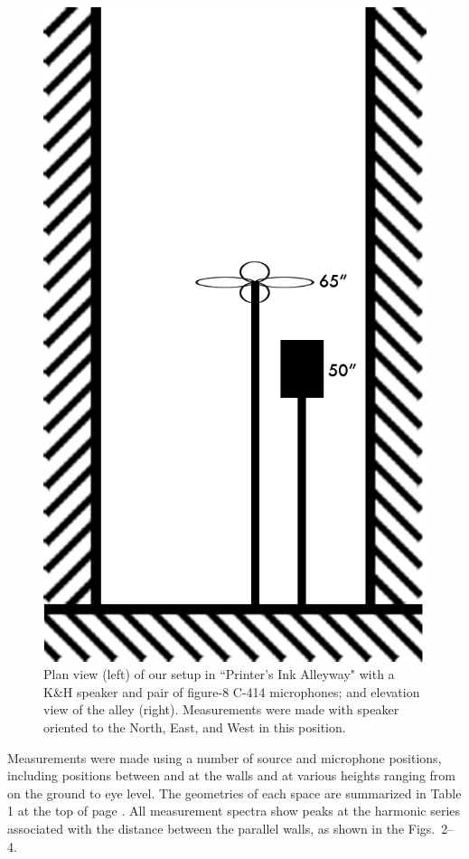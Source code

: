 \documentclass{aes137}
\begin{document}
\begin{figure}
\begin{minipage}[b]{0.41\linewidth}
\includegraphics[width=\textwidth]{images/alleyway_lookingdown.png}
\end{minipage}

\caption{Plan view (left) of our setup in ``Printer's Ink Alleyway"
  with a K\&H speaker and pair of figure-8 C-414 microphones; and
  elevation view of the alley (right). Measurements were made with
  speaker oriented to the North, East, and West in this position.}
\end{figure}

Measurements were made using a number of source and microphone
positions, including positions between and at the walls and at various
heights ranging from on the ground to eye level. The geometries of
each space are summarized in Table 1 at the top of page
\pageref{table:geometries}. All measurement spectra show peaks at the
harmonic series associated with the distance between the parallel
walls, as shown in the Figs.~2--4.
\end{document}
